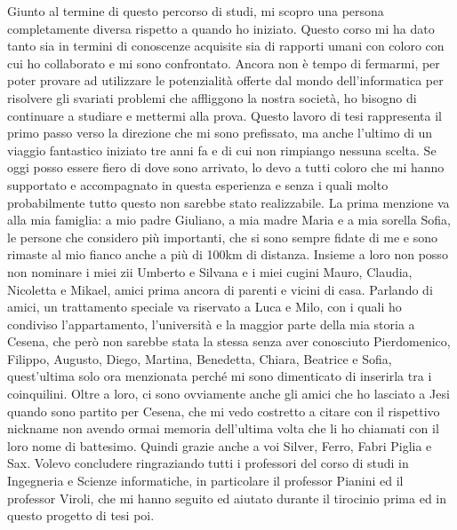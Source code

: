 Giunto al termine di questo percorso di studi, mi scopro una persona completamente diversa rispetto a quando ho iniziato. Questo corso mi ha dato tanto sia in termini di conoscenze acquisite sia di rapporti umani con coloro con cui ho collaborato e mi sono confrontato. \newline 
Ancora non è tempo di fermarmi, per poter provare ad utilizzare le potenzialità offerte dal mondo dell'informatica per risolvere gli svariati problemi che affliggono la nostra società, ho bisogno di continuare a studiare e mettermi alla prova. \newline 
Questo lavoro di tesi rappresenta il primo passo verso la direzione che mi sono prefissato, ma anche l'ultimo di un viaggio fantastico iniziato tre anni fa e di cui non rimpiango nessuna scelta. \newline
Se oggi posso essere fiero di dove sono arrivato, lo devo a tutti coloro che mi hanno supportato e accompagnato in questa esperienza e senza i quali molto probabilmente tutto questo non sarebbe stato realizzabile. \newline
La prima menzione va alla mia famiglia: a mio padre Giuliano, a mia madre Maria e a mia sorella Sofia, le persone che considero più importanti, che si sono sempre fidate di me e sono rimaste al mio fianco anche a più di 100km di distanza. Insieme a loro non posso non nominare i miei zii Umberto e Silvana e i miei cugini Mauro, Claudia, Nicoletta e Mikael, amici prima ancora di parenti e vicini di casa. \newline
Parlando di amici, un trattamento speciale va riservato a Luca e Milo, con i quali ho condiviso l'appartamento, l'università e la maggior parte della mia storia a Cesena, che però non sarebbe stata la stessa senza aver conosciuto Pierdomenico, Filippo, Augusto, Diego, Martina, Benedetta, Chiara, Beatrice e Sofia, quest'ultima solo ora menzionata perché mi sono dimenticato di inserirla tra i coinquilini. \newline
Oltre a loro, ci sono ovviamente anche gli amici che ho lasciato a Jesi quando sono partito per Cesena, che mi vedo costretto a citare con il rispettivo nickname non avendo ormai memoria dell'ultima volta che li ho chiamati con il loro nome di battesimo. Quindi grazie anche a voi Silver, Ferro, Fabri Piglia e Sax. \newline
Volevo concludere ringraziando tutti i professori del corso di studi in Ingegneria e Scienze informatiche, in particolare il professor Pianini ed il professor Viroli, che mi hanno seguito ed aiutato durante il tirocinio prima ed in questo progetto di tesi poi.